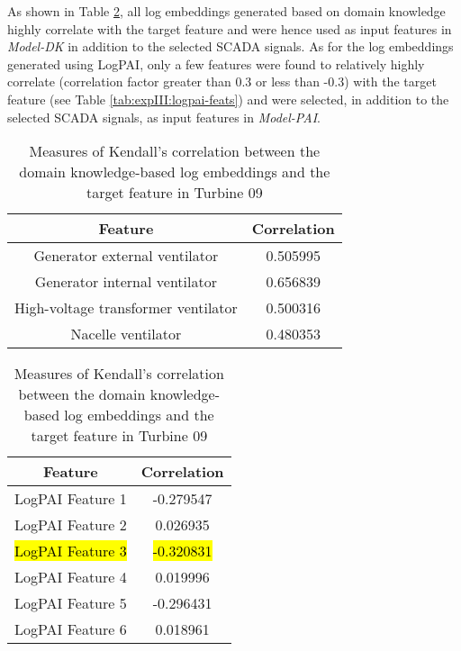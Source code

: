 As shown in Table \ref{tab:expIII:domain-knowledge-feats}, all log embeddings generated based on domain knowledge highly correlate with the target feature 
and were hence used as input features in \emph{Model-DK} in addition to the selected SCADA signals.
As for the log embeddings generated using LogPAI, only a few features were found to relatively highly correlate (correlation factor greater than 0.3 or less than -0.3) 
with the target feature (see Table \ref{tab:expIII:logpai-feats}) and were selected, in addition to the selected SCADA signals, as input features in \emph{Model-PAI}.
\begin{table}[H]
    \parbox{.45\linewidth}{
    \centering
    \begin{tabular}{|c|c|}
        \hline
        Feature & Correlation\\
        \hline
        \multicolumn{1}{|m{0.25\textwidth}|}{Generator external ventilator} & 0.505995\\
        \hline
        \multicolumn{1}{|m{0.25\textwidth}|}{Generator internal ventilator} & 0.656839\\
        \hline
        \multicolumn{1}{|m{0.25\textwidth}|}{High-voltage transformer ventilator} & 0.500316\\
        \hline
        \multicolumn{1}{|m{0.25\textwidth}|}{Nacelle ventilator} & 0.480353\\
        \hline
    \end{tabular}
    \caption{Measures of Kendall's correlation between the domain knowledge-based log embeddings and the target feature in Turbine 09}
    \label{tab:expIII:domain-knowledge-feats}
    }
    \hfill
    \parbox{.45\linewidth}{
    \centering
    \begin{tabular}{|c|c|}
        \hline
        Feature & Correlation\\
        \hline
        \multicolumn{1}{|m{0.25\textwidth}|}{LogPAI Feature 1} & -0.279547\\
        \hline
        \multicolumn{1}{|m{0.25\textwidth}|}{LogPAI Feature 2} & 0.026935\\
        \hline
        \multicolumn{1}{|m{0.25\textwidth}|}{\hl{LogPAI Feature 3}} & \hl{-0.320831}\\
        \hline
        \multicolumn{1}{|m{0.25\textwidth}|}{LogPAI Feature 4} & 0.019996\\
        \hline
        \multicolumn{1}{|m{0.25\textwidth}|}{LogPAI Feature 5} & -0.296431\\
        \hline
        \multicolumn{1}{|m{0.25\textwidth}|}{LogPAI Feature 6} & 0.018961\\

\end{tabular}}
\end{table}
